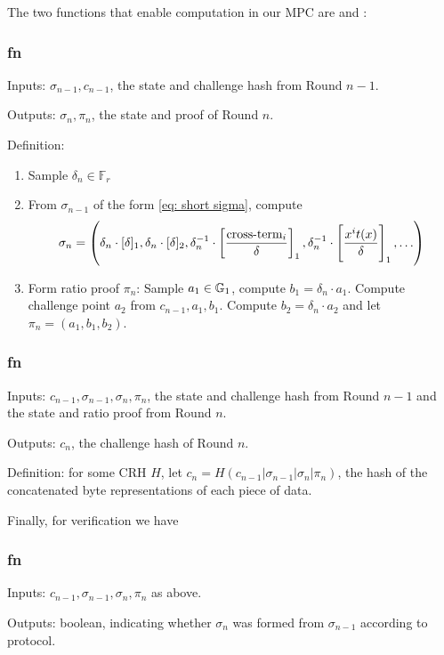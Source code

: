 The two functions that enable computation in our MPC are \contribute{} and \challenge{}:

\subsubsection*{fn \contribute{}}
Inputs: $\sigma_{n-1}, c_{n-1}$, the state and challenge hash from Round $n-1$.

Outputs: $\sigma_n, \pi_n$, the state and proof of Round $n$.

Definition: 
    \begin{enumerate}
        \item Sample $\delta_n \in \mathbb{F}_r$
        \item From $\sigma_{n-1}$ of the form \eqref{eq: short sigma}, compute 
            \begin{equation*}
                \sigma_n = \left( \delta_n\cdot [\delta]_1, \delta_n\cdot [\delta]_2, \delta_n^{-1} \cdot \left[\frac{\text{cross-term}_i }{\delta}\right]_1, \delta_n^{-1} \cdot \left[ \frac{x^i t(x)}{\delta} \right]_1 , \ldots \right)
            \end{equation*}
        \item Form ratio proof $\pi_n$: Sample $a_1 \in \mathbb{G}_1$, compute $b_1 = \delta_n \cdot a_1$. Compute challenge point $a_2$ from $c_{n-1}, a_1, b_1$. Compute $b_2 = \delta_n \cdot a_2$ and let $\pi_n = (a_1, b_1, b_2)$.
    \end{enumerate}

\subsubsection*{fn \challenge{}}
Inputs: $c_{n-1}, \sigma_{n-1}, \sigma_n, \pi_n$, the state and challenge hash from Round $n-1$ and the state and ratio proof from Round $n$.

Outputs: $c_n$, the challenge hash of Round $n$.

Definition: for some CRH $H$, let $c_n = H(c_{n-1} \vert \sigma_{n-1} \vert \sigma_n \vert \pi_n)$, the hash of the concatenated byte representations of each piece of data.

Finally, for verification we have 

\subsubsection*{fn \verify{}}
Inputs: $c_{n-1}, \sigma_{n-1}, \sigma_n, \pi_n$ as above.

Outputs: boolean, indicating whether $\sigma_n$ was formed from $\sigma_{n-1}$ according to protocol.

